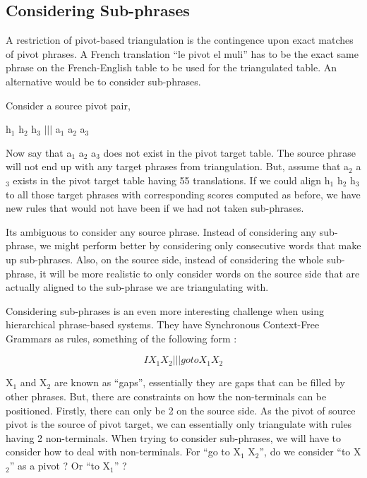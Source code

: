 \subsection{Considering Sub-phrases}
	A restriction of pivot-based triangulation is the contingence upon exact matches of pivot phrases. A French translation ``le pivot el muli'' has to be the exact same phrase on the French-English table to be used for the triangulated table. An alternative would be to consider sub-phrases. 

	Consider a source pivot pair, 

	\indent
		h$_{1}$ h$_{2}$ h$_{3}$ $|||$ a$_{1}$ a$_{2}$ a$_{3}$

	Now say that a$_{1}$ a$_{2}$ a$_{3}$ does not exist in the pivot target table. The source phrase will not end up with any target phrases from triangulation. But, assume that a$_{2}$ a$_{3}$ exists in the pivot target table having 55 translations. If we could align h$_{1}$ h$_{2}$ h$_{3}$ to all those target phrases with corresponding scores computed as before, we have new rules that would not have been if we had not taken sub-phrases. 

	Its ambiguous to consider any source phrase. Instead of considering any sub-phrase, we might perform better by considering only consecutive words that make up sub-phrases. Also, on the source side, instead of considering the whole sub-phrase, it will be more realistic to only consider words on the source side that are actually aligned to the sub-phrase we are triangulating with. 

	Considering sub-phrases is an even more interesting challenge when using hierarchical phrase-based systems. They have Synchronous Context-Free Grammars as rules, something of the following form : 

	\begin{equation}
		I X_{1} X_{2} ||| go to X_{1} X_{2}
	\end{equation}

	X$_{1}$ and X$_{2}$ are known as ``gaps'', essentially they are gaps that can be filled by other phrases. But, there are constraints on how the non-terminals can be positioned. Firstly, there can only be 2 on the source side. As the pivot of source pivot is the source of pivot target, we can essentially only triangulate with rules having 2 non-terminals. When trying to consider sub-phrases, we will have to consider how to deal with non-terminals. For ``go to X$_{1}$ X$_{2}$'', do we consider ``to X$_{2}$'' as a pivot ? Or ``to X$_{1}$'' ? 

